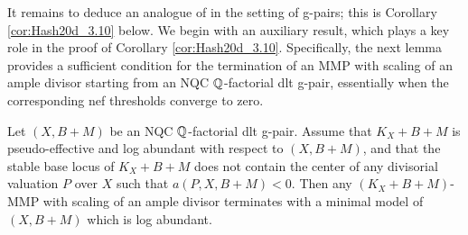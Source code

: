 		
	
	It remains to deduce an analogue of \cite[Corollary 3.10]{Hash20d} in the setting of g-pairs; this is Corollary \ref{cor:Hash20d_3.10} below. We begin with an auxiliary result, which plays a key role in the proof of Corollary \ref{cor:Hash20d_3.10}. Specifically, the next lemma provides a sufficient condition for the termination of an MMP with scaling of an ample divisor starting from an NQC $\mathbb{Q}$-factorial dlt g-pair, essentially when the corresponding nef thresholds converge to zero.
	
	\begin{lem}\label{lem:Hash20d_3.10_auxiliary}
		Let $(X,B+M)$ be an NQC $\mathbb{Q}$-factorial dlt g-pair. Assume that $K_X+B+M$ is pseudo-effective and log abundant with respect to $(X,B+M)$, and that the stable base locus of $K_X+B+M$ does not contain the center of any divisorial valuation $ P $ over $X$ such that $ a(P,X,B+M) < 0 $. Then any $(K_X+B+M)$-MMP with scaling of an ample divisor terminates with a minimal model of $(X,B+M)$ which is log abundant.
	\end{lem}
	
